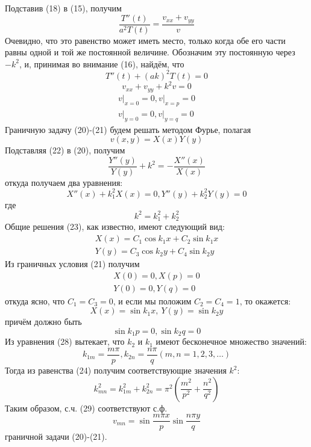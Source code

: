 \begin{enumerate}
Подставив (18) в (15), получим
\[
	\frac{T''(t)}{a^2 T(t)} = \frac{v_{xx} + v_{yy}}{v}
\]
Очевидно, что это равенство может иметь место, только когда обе его части равны одной и той же постоянной величине. Обозначим эту постоянную через $-k^2$, и, принимая во внимание (16), найдём, что
\[
	T''(t) + (ak)^2 T(t) = 0 \tag{19}
\]
\[
	v_{xx} + v_{yy} + k^2 v = 0 \tag{20}
\]
\[
	\begin{aligned}
	\left. v\right|_{x=0} = 0, \left. v\right|_{x=p} = 0 \\
			\left. v\right|_{y=0} = 0, \left. v\right|_{y=q} = 0
				\end{aligned} \tag{21}
\]
Граничную задачу (20)-(21) будем решать методом Фурье, полагая
\[
	v(x,y) = X(x) Y(y) \tag{22}
\]
Подставляя (22) в (20), получим
\[
	\frac{Y''(y)}{Y(y)} + k^2 = -\frac{X''(x)}{X(x)}
\]
откуда получаем два уравнения:
\[
	X''(x) + k_1^2 X(x) = 0, Y''(y) + k_2^2 Y(y) = 0 \tag{23}
\]
где
\[
	k^2 = k_1^2 + k_2^2 \tag{24}
\]
Общие решения (23), как известно, имеют следующий вид:
\[
	\begin{aligned}
		X(x) = C_1 \cos k_1 x + C_2 \sin k_1 x \\
		Y(y) = C_3 \cos k_2 y + C_4 \sin k_2 y
	\end{aligned} \tag{25}
\]
Из граничных условия (21) получим
\[
	\begin{aligned}
		X(0) = 0, X(p) = 0 \\
		Y(0) = 0, Y(q) = 0
	\end{aligned} \tag{26}
\]
откуда ясно, что $C_1 = C_3 = 0$, и если мы положим $C_2 = C_4 = 1$, то окажется:
\[
	X(x) = \sin k_1 x, ~ Y(y) = \sin k_2 y \tag{27}
\]
причём должно быть
\[
	\sin k_1 p = 0, \sin k_2 q = 0 \tag{28}
\]
Из уравнения (28) вытекает, что $k_2$ и $k_1$ имеют бесконечное множество значений:
\[
	k_{1m} = \frac{m\pi}{p}, k_{2n} = \frac{n \pi}{q} (m,n=1,2,3,\dots)
\]
Тогда из равенства (24) получим соответствующие значения $k^2$:
\[
	k_{mn}^2 = k_{1m}^2 + k_{2n}^2 = \pi^2 \left( \frac{m^2}{p^2} + \frac{n^2}{q^2}\right) \tag{29}
\]
Таким образом, с.ч. (29) соответствуют с.ф.
\[
	v_{mn} = \sin \frac{m \pi x}{p} \sin \frac{n \pi y}{q} \tag{30}
\]
граничной задачи (20)-(21).


\end{enumerate}
